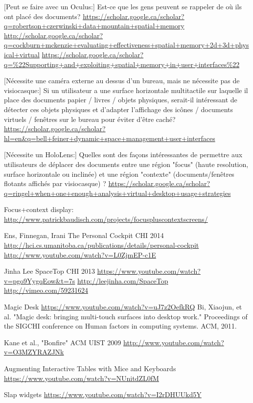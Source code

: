 [Peut se faire avec un Oculus:]
Est-ce que les gens peuvent se rappeler de où ils ont placé des documents?
\url{https://scholar.google.ca/scholar?q=robertson+czerwinski+data+mountain+spatial+memory}
\url{http://scholar.google.ca/scholar?q=cockburn+mckenzie+evaluating+effectiveness+spatial+memory+2d+3d+physical+virtual}
\url{https://scholar.google.ca/scholar?q=%22Supporting+and+exploiting+spatial+memory+in+user+interfaces%22}
 
[Nécessite une caméra externe au dessus d'un bureau, mais ne nécessite pas de visiocasque:]
Si un utilisateur a une surface horizontale multitactile sur laquelle il place des documents papier / livres / objets physiques, serait-il intéressant de détecter ces objets physiques et d'adapter l'affichage des icônes / documents virtuels / fenêtres sur le bureau pour éviter d'être caché?
\url{https://scholar.google.ca/scholar?hl=en&q=bell+feiner+dynamic+space+management+user+interfaces}
 
[Nécessite un HoloLens:]
Quelles sont des façons intéressantes de permettre aux utilisateurs de déplacer des documents entre une région "focus" (haute resolution, surface horizontale ou inclinée) et une région "contexte" (documents/fenêtres flotants affichés par visiocasque) ?
\url{https://scholar.google.ca/scholar?q=ringel+when+one+enough+analysis+virtual+desktop+usage+strategies}
 
Focus+context display:
\url{http://www.patrickbaudisch.com/projects/focuspluscontextscreens/}
 
 
 
 
Ens, Finnegan, Irani
The Personal Cockpit
CHI 2014
\url{http://hci.cs.umanitoba.ca/publications/details/personal-cockpit}
\url{http://www.youtube.com/watch?v=L0ZjmEP-c1E}
 
Jinha Lee
SpaceTop
CHI 2013
\url{https://www.youtube.com/watch?v=pgo9YygqEow&t=7s}
\url{http://leejinha.com/SpaceTop}
\url{http://vimeo.com/59231624}
 
Magic Desk
\url{https://www.youtube.com/watch?v=uJ7z2OefkRQ}
Bi, Xiaojun, et al. "Magic desk: bringing multi-touch surfaces into desktop work." Proceedings of the SIGCHI conference on Human factors in computing systems. ACM, 2011.
 
Kane et al., "Bonfire"
ACM UIST 2009
\url{http://www.youtube.com/watch?v=O3MZYRAZJNk}
 
Augmenting Interactive Tables with Mice and Keyboards
\url{https://www.youtube.com/watch?v=NUnitdZL0fM}
 
Slap widgets
\url{https://www.youtube.com/watch?v=I2rDHUUkd5Y}
 
